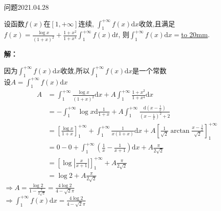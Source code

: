 \begin{mybox}{问题2021.04.28}
	
	\qquad 设函数$f(x)$在$[1,+\infty]$连续, $\int_{1}^{+\infty}f(x)\mathrm{d}x$收敛,且满足\\
	$ f(x)= \frac{\log{x} }{(1+x)^2} +\frac{1+x^2}{1+x^4} \int_{1}^{+\infty}f(x)\mathrm{d}t $, 则\( \int_{1}^{+\infty}f(x)\mathrm{d}x =  \)\underline{\hbox to 20mm{}}.
\end{mybox}
\noindent
\textbf{解：}

因为$\int_{1}^{+\infty}f(x)\mathrm{d}x$收敛,所以$\int_{1}^{+\infty}f(x)\mathrm{d}x$是一个常数\\
设$A=\int_{1}^{+\infty}f(x)\mathrm{d}x$
\begin{align*}
	A&=\int_{1}^{+\infty} \frac{\log{x}}{(1+x)^2}\mathrm{d}x +A\int_{1}^{+\infty}\frac{1+x^2}{1+x^4}\mathrm{d}x\\
	&=-\int_{1}^{+\infty} \log{x}\mathrm{d}\frac{1}{1+x}+ A\int_{1}^{+\infty} \frac{\mathrm{d}(x-\frac{1}{x})}{(x-\frac{1}{x})^2 +2}\\
	&=[\frac{\log{x}}{1+x}]_{1}^{+\infty} + \int_{1}^{+\infty} \frac{1}{x(1+x)}\mathrm{d}x +A[\frac{1}{\sqrt{2}} \arctan{\frac{x-\frac{1}{x}}{\sqrt{2}}}]_{1}^{+\infty}\\
	&=0-0+\int_{1}^{+\infty}(\frac{1}{x}-\frac{1}{x+1})\mathrm{d}x + A\frac{\pi}{2\sqrt{2}}\\
	&=[\log{\left|\frac{x}{x+1} \right|}]_{1}^{+\infty}+ A\frac{\pi}{2\sqrt{2}}\\
	&=\log{2}+A\frac{\pi}{2\sqrt{2}}
\end{align*}
$\Rightarrow A = \frac{\log{2}}{1-\frac{\pi}{2\sqrt{2}}}= \frac{4\log{2}}{4-\sqrt{2}\pi}$\\
$\Rightarrow \int_{1}^{+\infty}f(x)\mathrm{d}x =  \frac{4\log{2}}{4-\sqrt{2}\pi}$